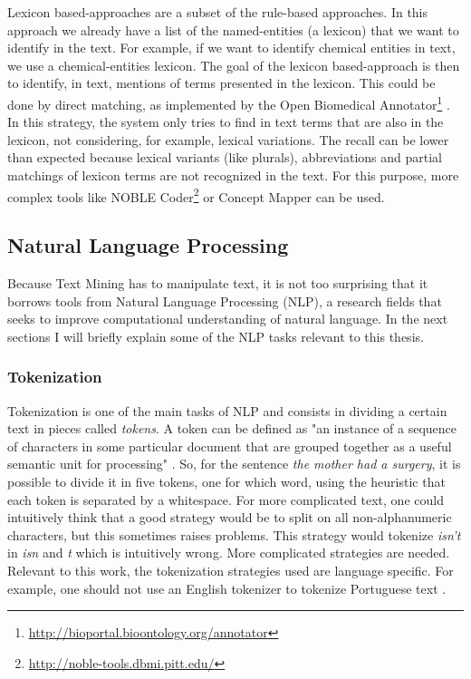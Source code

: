 Lexicon based-approaches are a subset of the rule-based approaches. In this approach we already have a list of the named-entities (a lexicon) that we want to identify in the text. For example, if we want to identify chemical entities in text, we use a chemical-entities lexicon. The goal of the lexicon based-approach is then to identify, in text, mentions of terms presented in the lexicon. This could be done by direct matching, as implemented by the Open Biomedical Annotator\footnote{\url{http://bioportal.bioontology.org/annotator}} \citep{Jonquet2009}. In this strategy, the system only tries to find in text terms that are also in the lexicon, not considering, for example, lexical variations. The recall can be lower than expected because lexical variants (like plurals), abbreviations and partial matchings of lexicon terms are not recognized in the text. For this purpose, more complex tools like NOBLE Coder\footnote{\url{http://noble-tools.dbmi.pitt.edu/}} \citep{Tseytlin2016} or Concept Mapper \citep{Stewart} can be used.

\subsection{Natural Language Processing}

Because Text Mining has to manipulate text, it is not too surprising that it borrows tools from Natural Language Processing (NLP), a research fields that seeks to improve computational understanding of natural language. In the next sections I will briefly explain some of the NLP tasks relevant to this thesis.

\subsubsection{Tokenization}

Tokenization is one of the main tasks of NLP and consists in dividing a certain text in pieces called \textit{tokens}. A token can be defined as "an instance
of a sequence of characters in some particular document that are grouped
together as a useful semantic unit for processing" \citep{Manning2009a}. So, for the sentence \textit{the mother had a surgery}, it is possible to divide it in five tokens, one for which word, using the heuristic that each token is separated by a whitespace. For more complicated text, one could intuitively think that a good strategy would be to split on all non-alphanumeric characters, but this sometimes raises problems. This strategy would tokenize \textit{isn't} in \textit{isn} and \textit{t} which is intuitively wrong. More complicated strategies are needed. Relevant to this work, the tokenization strategies used are language specific. For example, one should not use an English tokenizer to tokenize Portuguese text \citep{Branco2003}.

